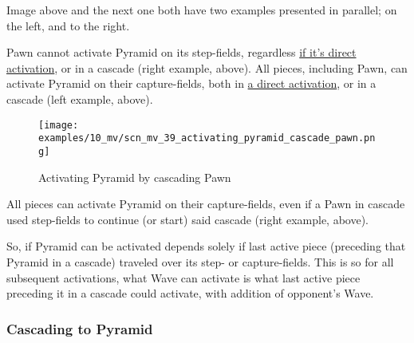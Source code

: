 \vspace*{-0.3\baselineskip}
Image above and the next one both have two examples presented in parallel; on the left,
and to the right.

Pawn cannot activate Pyramid on its step-fields, regardless
\hyperref[fig:scn_ma_04_pyramid_activation_by_pawn]{if it's direct activation}, or in a cascade
(right example, above). All pieces, including Pawn, can activate Pyramid on their capture-fields,
both in \hyperref[fig:scn_ma_01_pyramid_activation_init]{a direct activation}, or in a cascade
(left example, above).

\clearpage %

\vspace*{-2.5\baselineskip}
\noindent
\begin{figure}[!h]
\texttt{[image: examples/10\_mv/scn\_mv\_39\_activating\_pyramid\_cascade\_pawn.png]}
\vspace*{-1.5\baselineskip}
\caption{Activating Pyramid by cascading Pawn}
\label{fig:scn_mv_39_activating_pyramid_cascade_pawn}
\end{figure}

\vspace*{-0.5\baselineskip}
All pieces can activate Pyramid on their capture-fields, even if a Pawn in cascade
used step-fields to continue (or start) said cascade (right example, above).

So, if Pyramid can be activated depends solely if last active piece (preceding that
Pyramid in a cascade) traveled over its step- or capture-fields. This is so for all
subsequent activations, what Wave can activate is what last active piece preceding
it in a cascade could activate, with addition of opponent's Wave.

\clearpage %

\subsubsection*{Cascading to Pyramid}
\label{sec:Miranda's veil/Wave/Cascading Waves/Cascading to Pyramid}

